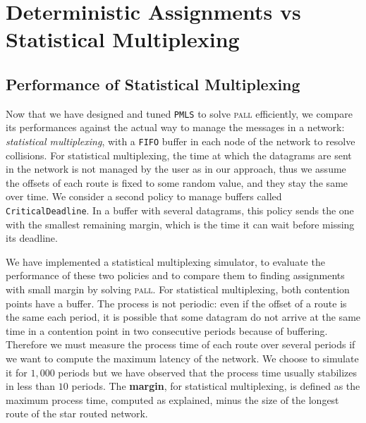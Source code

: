 \documentclass[a4paper,10pt]{article}
\newcommand\PMLS{\texttt{PMLS}\xspace}
\newcommand\FIFO{\texttt{FIFO}\xspace}
\newcommand\critdead{\texttt{CriticalDeadline}\xspace}
\newcommand\pall{\textsc{pall}\xspace}
\begin{document}
\section{Deterministic Assignments vs Statistical Multiplexing}\label{sec:comparison}

     \subsection{Performance of Statistical Multiplexing}

    
      Now that we have designed and tuned \PMLS to solve \pall efficiently, we compare its performances against the actual way to manage the messages in a network:  \emph{statistical multiplexing}, with a \FIFO buffer in each node of the network to resolve collisions. For statistical multiplexing, the time at which the datagrams are sent in the network is not managed by the user as in our approach, thus we assume the offsets of each route is fixed to some random value, and they stay the same over time.
      We consider a second policy to manage buffers called \critdead. In a buffer with several datagrams, this policy sends the one with the smallest remaining margin, which is the time it can wait before missing its deadline.


  	We have implemented a statistical multiplexing simulator, to evaluate the performance of these two policies and to compare them to finding assignments with small margin by solving \pall. 
  	For statistical multiplexing, both contention points have a buffer. The process is not periodic:
  	even if the offset of a route is the same each period, it is possible that some datagram do not arrive at the same time in a contention point in two consecutive periods because of buffering. Therefore we must measure the process time of each route over several periods if we want to compute the maximum latency of the network. We choose to simulate it for $1,000$ periods but we have observed that the process time usually stabilizes in less than $10$ periods. The \textbf{margin}, for statistical multiplexing, is defined as the maximum process time, computed as explained, minus the size of the longest route of the star routed network. 
	
\end{document}
